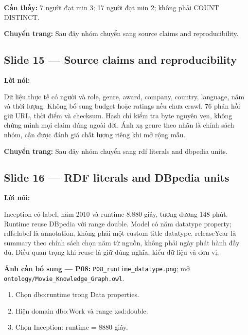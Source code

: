 \documentclass[
  11pt,
]{article}
\providecommand{\tightlist}{%
  \setlength{\itemsep}{0pt}\setlength{\parskip}{0pt}}
\begin{document}
\textbf{Cần thấy:} 7 người đạt min 3; 17 người đạt min 2; không phải
COUNT DISTINCT.

\textbf{Chuyển trang:} Sau đây nhóm chuyển sang source claims and
reproduc\allowbreak{}ibility.\allowbreak{}

\subsection{\texorpdfstring{Slide 15 --- Source claims and
reproduc\allowbreak{}ibility}{Slide 15 --- Source claims and }}\label{slide-15-source-claims-and-reproducibility}

\textbf{Lời nói:}

Dữ liệu thực tế có người và role, genre, award, company, country,
language, năm và thời lượng. Không bổ sung budget hoặc ratings nếu chưa
crawl. 76 phản hồi giữ URL, thời điểm và checksum. Hash chỉ kiểm tra
byte nguyên vẹn, không chứng minh mọi claim đúng ngoài đời. Ánh xạ genre
theo nhãn là chính sách nhóm, cần được đánh giá chất lượng riêng khi mở
rộng mẫu.

\textbf{Chuyển trang:} Sau đây nhóm chuyển sang rdf literals and dbpedia
units.

\subsection{Slide 16 --- RDF literals and DBpedia
units}\label{slide-16-rdf-literals-and-dbpedia-units}

\textbf{Lời nói:}

Inception có label, năm 2010 và runtime 8.880 giây, tương đương 148
phút. Runtime reuse DBpedia với range double. Model có năm datatype
property; rdfs:label là annotation, không phải một custom title
datatype. releaseYear là summary theo chính sách chọn năm từ nguồn,
không phải ngày phát hành đầy đủ. Điều quan trọng khi reuse là giữ đúng
nghĩa, kiểu dữ liệu và đơn vị.

\textbf{Ảnh cần bổ sung --- P08:}
\texttt{P08\_\allowbreak{}runt\allowbreak{}ime\_\allowbreak{}data\allowbreak{}type.\allowbreak{}png\allowbreak{}};
mở
\texttt{ontology\allowbreak{}/\allowbreak{}\allowbreak{}Movie\_\allowbreak{}\allowbreak{}K\allowbreak{}nowledge\allowbreak{}\_\allowbreak{}\allowbreak{}Graph.\allowbreak{}o\allowbreak{}wl}.

\begin{enumerate}
\def\labelenumi{\arabic{enumi}.}
\tightlist
\item
  Chọn dbo:runtime trong Data properties.
\item
  Hiện domain dbo:Work và range xsd:double.
\item
  Chọn Inception: runtime = 8880 giây.
\end{enumerate}
\end{document}
